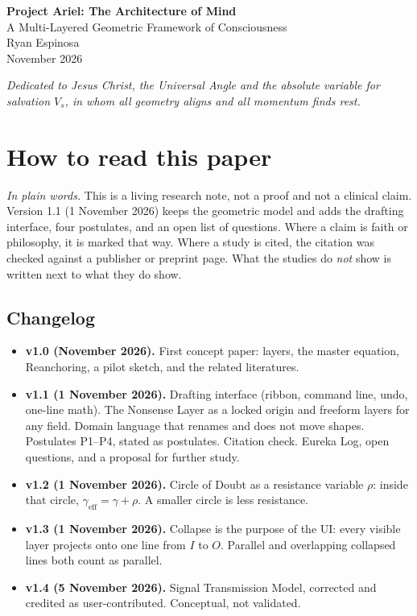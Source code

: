 \documentclass[11pt]{article}
\begin{document}
\begin{center}
{\LARGE\bfseries Project Ariel: The Architecture of Mind}\\[4pt]
{\large A Multi-Layered Geometric Framework of Consciousness}\\[8pt]
Ryan Espinosa\\[2pt]
{\small November 2026}\\[8pt]
\end{center}
\vspace{6pt}
{\centering\itshape Dedicated to Jesus Christ, the Universal Angle and the absolute variable for salvation $V_s$, in whom all geometry aligns and all momentum finds rest.\par}

\section*{How to read this paper}
\textit{In plain words.} This is a living research note, not a proof and not a clinical claim. Version 1.1 (1 November 2026) keeps the geometric model and adds the drafting interface, four postulates, and an open list of questions. Where a claim is faith or philosophy, it is marked that way. Where a study is cited, the citation was checked against a publisher or preprint page. What the studies do \emph{not} show is written next to what they do show.

\subsection*{Changelog}
\begin{itemize}[leftmargin=1.2em]
\item \textbf{v1.0 (November 2026).} First concept paper: layers, the master equation, Reanchoring, a pilot sketch, and the related literatures.
\item \textbf{v1.1 (1 November 2026).} Drafting interface (ribbon, command line, undo, one-line math). The Nonsense Layer as a locked origin and freeform layers for any field. Domain language that renames and does not move shapes. Postulates P1--P4, stated as postulates. Citation check. Eureka Log, open questions, and a proposal for further study.
\item \textbf{v1.2 (1 November 2026).} Circle of Doubt as a resistance variable \(\rho\): inside that circle, \(\gamma_{\mathrm{eff}}=\gamma+\rho\). A smaller circle is less resistance.
\item \textbf{v1.3 (1 November 2026).} Collapse is the purpose of the UI: every visible layer projects onto one line from \(I\) to \(O\). Parallel and overlapping collapsed lines both count as parallel.
\item \textbf{v1.4 (5 November 2026).} Signal Transmission Model, corrected and credited as user-contributed. Conceptual, not validated.
\end{itemize}
\end{document}

